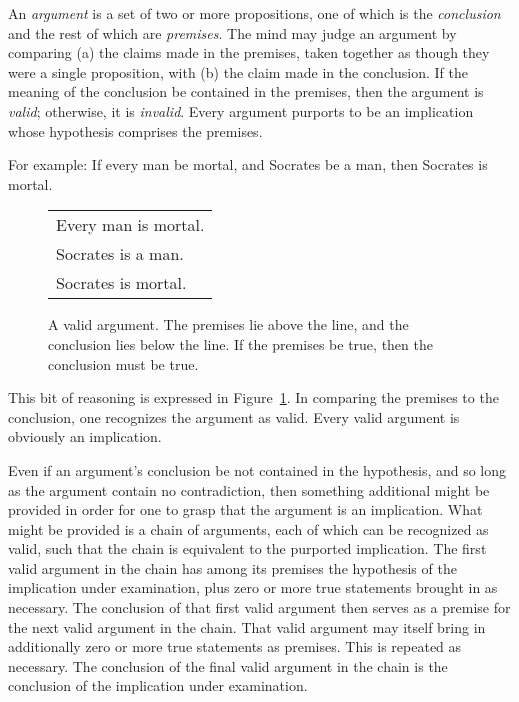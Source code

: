 An \emph{argument} is a set of two or more propositions, one of which is the
\emph{conclusion} and the rest of which are \emph{premises}.  The mind may
judge an argument by comparing (a) the claims made in the premises, taken
together as though they were a single proposition, with (b) the claim made in
the conclusion.  If the meaning of the conclusion be contained in the premises,
then the argument is \emph{valid}; otherwise, it is \emph{invalid}.  Every
argument purports to be an implication whose hypothesis comprises the premises.

For example: If every man be mortal, and Socrates be a man, then Socrates is
mortal.
\begin{figure}
   \begin{center}
      \begin{framed}
         \begin{tabular}{l}
            Every man is mortal.\\
            Socrates is a man.\\
            \midrule
            Socrates is mortal.
         \end{tabular}
      \end{framed}
   \end{center}
   \caption{A valid argument.  The premises lie above the line, and the
      conclusion lies below the line.  If the premises be true, then the
      conclusion must be true.%
   }
\label{fig:valid-arg}
\end{figure}
This bit of reasoning is expressed in Figure~\ref{fig:valid-arg}.  In comparing
the premises to the conclusion, one recognizes the argument as valid.  Every
valid argument is obviously an implication.

Even if an argument's conclusion be not contained in the hypothesis, and so
long as the argument contain no contradiction, then something additional might
be provided in order for one to grasp that the argument is an implication.
What might be provided is a chain of arguments, each of which can be recognized
as valid, such that the chain is equivalent to the purported implication. The
first valid argument in the chain has among its premises the hypothesis of the
implication under examination, plus zero or more true statements brought in as
necessary.  The conclusion of that first valid argument then serves as a
premise for the next valid argument in the chain. That valid argument may
itself bring in additionally zero or more true statements as premises. This is
repeated as necessary. The conclusion of the final valid argument in the chain
is the conclusion of the implication under examination.

